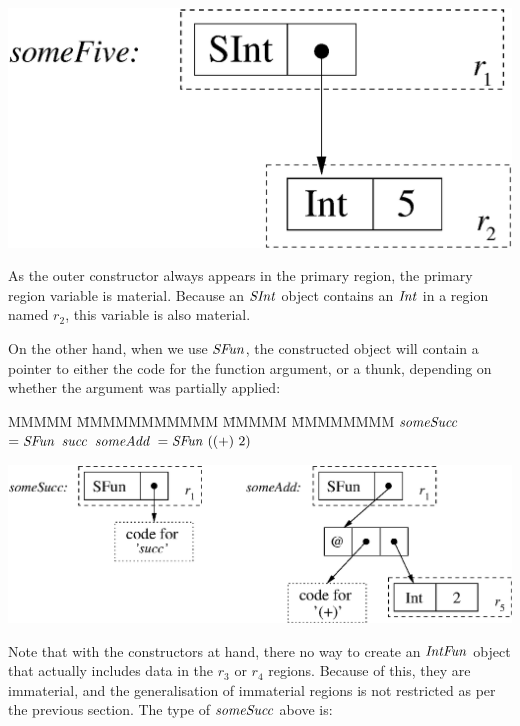 \vspace{-1em}
\begin{center}
\includegraphics[scale=0.4]{2-System/fig/closure-someFive.eps}
\end{center}

As the outer constructor always appears in the primary region, the primary region variable is material. Because an $\operatorname{\mathit{SInt}}$ object contains an $\operatorname{\mathit{Int}}$ in a region named $r_2$, this variable is also material.

On the other hand, when we use $\operatorname{\mathit{SFun}}$, the constructed object will contain a pointer to either the code for the function argument, or a thunk, depending on whether the argument was partially applied:

\begin{tabbing}
 	MMMMM \= MMMMMMMMMMM \= MMMMM \= MMMMMMMM \kill
	$\operatorname{\mathit{someSucc}}$ \> $= \operatorname{\mathit{SFun}} \ \operatorname{\mathit{succ}}$  \> $\operatorname{\mathit{someAdd}}$ \> $= \operatorname{\mathit{SFun}} \ ((+) \ 2)$
\end{tabbing}

\vspace{-2em}
\begin{center}
\includegraphics[scale=0.7]{2-System/fig/closure-someSuccAdd.eps}
\end{center}

Note that with the constructors at hand, there no way to create an $\operatorname{\mathit{IntFun}}$ object that actually includes data in the $r_3$ or $r_4$ regions. Because of this, they are immaterial, and the generalisation of immaterial regions is not restricted as per the previous section. The type of $\operatorname{\mathit{someSucc}}$ above is:

